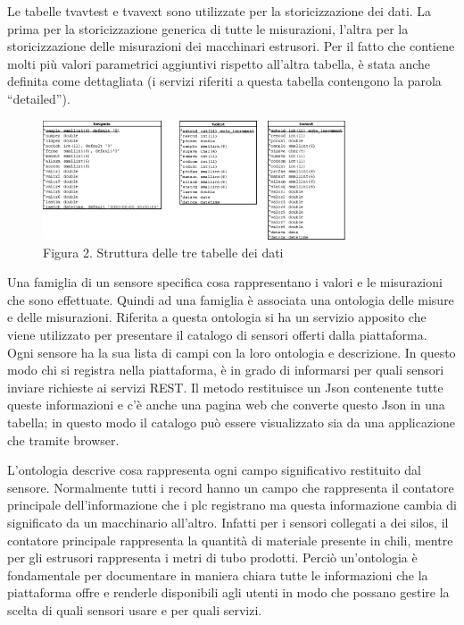 Le tabelle tvavtest e tvavext sono utilizzate per la storicizzazione dei dati. La prima per la storicizzazione generica di tutte le misurazioni, l’altra per la storicizzazione delle misurazioni dei macchinari estrusori. Per il fatto che contiene molti più valori parametrici aggiuntivi rispetto all’altra tabella, è stata anche definita come dettagliata (i servizi riferiti a questa tabella contengono la parola “detailed”).

\begin{figure}[h]
	\centering
	\includegraphics[width=0.8\textwidth]{tabelle-backend.png}
	\caption*{Figura 2.  Struttura delle tre tabelle dei dati}
\end{figure}
Una famiglia di un sensore specifica cosa rappresentano i valori e le misurazioni che sono effettuate. Quindi ad una famiglia è associata una ontologia delle misure e delle misurazioni. Riferita a questa ontologia si ha un servizio apposito che viene utilizzato per presentare il catalogo di sensori offerti dalla piattaforma. Ogni sensore ha la sua lista di campi con la loro ontologia e descrizione. In questo modo chi si registra nella piattaforma, è in grado di informarsi per quali sensori inviare richieste ai servizi REST. Il metodo restituisce un Json contenente tutte queste informazioni e c’è anche una pagina web che converte questo Json in una tabella; in questo modo il catalogo può essere visualizzato sia da una applicazione che tramite browser.
\par
L’ontologia descrive cosa rappresenta ogni campo significativo restituito dal sensore. Normalmente tutti i record hanno un campo che rappresenta il contatore principale dell’informazione che i plc registrano ma questa informazione cambia di significato da un macchinario all’altro. Infatti per i sensori collegati a dei silos, il contatore principale rappresenta la quantità di materiale presente in chili, mentre per gli estrusori rappresenta i metri di tubo prodotti. Perciò un’ontologia è fondamentale per documentare in maniera chiara tutte le informazioni che la piattaforma offre e renderle disponibili agli utenti in modo che possano gestire la scelta di quali sensori usare e per quali servizi.
\clearpage
